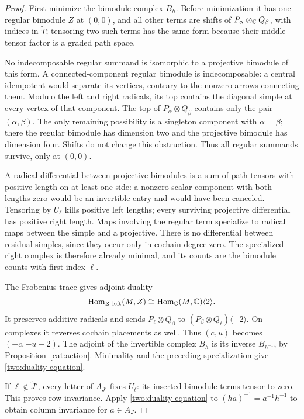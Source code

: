 \begin{proof}
First minimize the bimodule complex $B_h$.  Before minimization it
has one regular bimodule $Z$ at $(0,0)$, and all other terms are
shifts of $P_\alpha\otimes_{\mathbb C}Q_\beta$, with indices in
$\widetilde T$; tensoring two such terms has the same form because
their middle tensor factor is a graded path space.

No indecomposable regular summand is isomorphic to a projective
bimodule of this form.  A connected-component regular bimodule is
indecomposable: a central idempotent would separate its vertices,
contrary to the nonzero arrows connecting them.  Modulo the left
and right radicals, its top contains the diagonal simple at every
vertex of that component.  The top of $P_\alpha\otimes Q_\beta$
contains only the pair $(\alpha,\beta)$.  The only remaining
possibility is a singleton component with $\alpha=\beta$; there the
regular bimodule has dimension two and the projective bimodule has
dimension four.  Shifts do not change this obstruction.  Thus all
regular summands survive, only at $(0,0)$.

A radical differential between projective bimodules is a sum of path
tensors with positive length on at least one side: a nonzero
scalar component with both lengths zero would be an invertible
entry and would have been canceled.  Tensoring by $U_\ell$ kills
positive left lengths; every surviving projective differential has
positive right length.  Maps involving the regular term specialize
to radical maps between the simple and a projective.  There is no
differential between residual simples, since they occur only in
cochain degree zero.  The specialized right complex is therefore
already minimal, and its counts are the bimodule counts with first
index $\ell$.

The Frobenius trace gives adjoint duality
\[
 \operatorname{Hom}_{Z\text{-left}}(M,Z)\cong\operatorname{Hom}_{\mathbb C}(M,\mathbb C)\langle2\rangle.
\]
It preserves additive radicals and sends
$P_\ell\otimes Q_\beta$ to
$(P_\beta\otimes Q_\ell)\langle-2\rangle$.  On complexes it reverses
cochain placements as well.  Thus $(c,u)$ becomes $(-c,-u-2)$.
The adjoint of the invertible complex $B_h$ is its inverse
$B_{h^{-1}}$, by Proposition~\ref{cat:action}.  Minimality and the
preceding specialization give \eqref{two:duality-equation}.

If $\ell\notin\widetilde J'$, every letter of $A_{J'}$ fixes
$U_\ell$: its inserted bimodule terms tensor to zero.  This proves
row invariance.  Apply \eqref{two:duality-equation} to
$(ha)^{-1}=a^{-1}h^{-1}$ to obtain column invariance for $a\in A_J$.
\end{proof}

